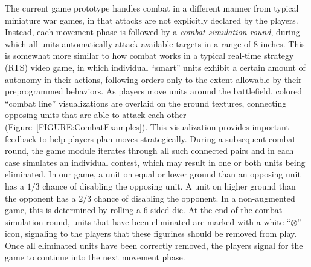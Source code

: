 \documentclass[review]{vgtc}                 %
\begin{document}

The current game prototype handles combat in a different manner from
typical miniature war games, in that attacks are not explicitly
declared by the players.  Instead, each movement phase is followed by
a \emph{combat simulation round}, during which all units automatically
attack available targets in a range of 8 inches.  This is somewhat
more similar to how combat works in a typical real-time strategy (RTS)
video game, in which individual ``smart'' units exhibit a certain
amount of autonomy in their actions, following orders only to the
extent allowable by their preprogrammed behaviors.
%
%
As players move units around the battlefield, colored ``combat line''
visualizations are overlaid on the ground textures, connecting
opposing units that are able to attack each other
(Figure~\ref{FIGURE:CombatExamples}).  This visualization provides
important feedback to help players plan moves strategically.  During a
subsequent combat round, the game module iterates through all such
connected pairs and in each case simulates an individual contest,
which may result in one or both units being eliminated.  In our game,
a unit on equal or lower ground than an opposing unit has a $1/3$
chance of disabling the opposing unit. A unit on higher ground
than the opponent has a $2/3$ chance of disabling the opponent. In a
non-augmented game, this is determined by rolling a 6-sided die.  At
the end of the combat simulation round, units that have been
eliminated are marked with a white ``$\otimes$'' icon, signaling to
the players that these figurines should be removed from play.  Once
all eliminated units have been correctly removed, the players signal
for the game to continue into the next movement phase.
\end{document}
